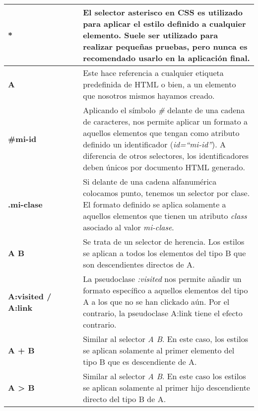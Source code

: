 \documentclass[../main.tex]{subfiles}
\begin{document}
        \begin{longtable}{|| p{0.3\linewidth} | p{0.7\linewidth} ||}
            \hline
            \textbf{*} & El selector asterisco en CSS es utilizado para aplicar el estilo definido a cualquier elemento. Suele ser utilizado para realizar pequeñas pruebas, pero nunca es recomendado usarlo en la aplicación final. \\ \hline
            
            \textbf{A} & Este hace referencia a cualquier etiqueta predefinida de HTML o bien, a un elemento que nosotros mismos hayamos creado. \\ \hline
            
            \textbf{\#mi-id} & Aplicando el símbolo \textit{\#} delante de una cadena de caracteres, nos permite aplicar un formato a aquellos elementos que tengan como atributo definido un identificador (\textit{id=``mi-id''}). A diferencia de otros selectores, los identificadores deben únicos por documento HTML generado. \\ \hline
            
            \textbf{.mi-clase} & Si delante de una cadena alfanumérica colocamos punto, tenemos un selector por clase. El formato definido se aplica solamente a aquellos elementos que tienen un atributo \textit{class} asociado al valor \textit{mi-clase}. \\ \hline
            
            \textbf{A B} & Se trata de un selector de herencia. Los estilos se aplican a todos los elementos del tipo B que son descendientes directos de A. \\ \hline
            
            \textbf{A:visited / A:link} & La pseudoclase \textit{:visited} nos permite añadir un formato específico a aquellos elementos del tipo A a los que no se han clickado aún. Por el contrario, la pseudoclase A:link tiene el efecto contrario. \\ \hline
            
            \textbf{A + B} & Similar al selector \textit{A B}. En este caso, los estilos se aplican solamente al primer elemento del tipo B que es descendiente de A. \\ \hline
            
            \textbf{A > B} & Similar al selector \textit{A B}. En este caso los estilos se aplican solamente al primer hijo descendiente directo del tipo B de A. \\ \hline
            

\end{longtable}
\end{document}

